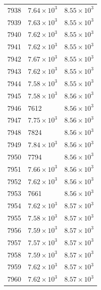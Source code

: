 \begin{table}[H]
\begin{tabular}{lll}
7938 & $\displaystyle 7.64 \times 10^{3}$ & $\displaystyle 8.55 \times 10^{3}$ \\
7939 & $\displaystyle 7.63 \times 10^{3}$ & $\displaystyle 8.55 \times 10^{3}$ \\
7940 & $\displaystyle 7.62 \times 10^{3}$ & $\displaystyle 8.55 \times 10^{3}$ \\
7941 & $\displaystyle 7.62 \times 10^{3}$ & $\displaystyle 8.55 \times 10^{3}$ \\
7942 & $\displaystyle 7.67 \times 10^{3}$ & $\displaystyle 8.55 \times 10^{3}$ \\
7943 & $\displaystyle 7.62 \times 10^{3}$ & $\displaystyle 8.55 \times 10^{3}$ \\
7944 & $\displaystyle 7.58 \times 10^{3}$ & $\displaystyle 8.55 \times 10^{3}$ \\
7945 & $\displaystyle 7.58 \times 10^{3}$ & $\displaystyle 8.56 \times 10^{3}$ \\
7946 & 7612 & $\displaystyle 8.56 \times 10^{3}$ \\
7947 & $\displaystyle 7.75 \times 10^{3}$ & $\displaystyle 8.56 \times 10^{3}$ \\
7948 & 7824 & $\displaystyle 8.56 \times 10^{3}$ \\
7949 & $\displaystyle 7.84 \times 10^{3}$ & $\displaystyle 8.56 \times 10^{3}$ \\
7950 & 7794 & $\displaystyle 8.56 \times 10^{3}$ \\
7951 & $\displaystyle 7.66 \times 10^{3}$ & $\displaystyle 8.56 \times 10^{3}$ \\
7952 & $\displaystyle 7.62 \times 10^{3}$ & $\displaystyle 8.56 \times 10^{3}$ \\
7953 & 7661 & $\displaystyle 8.56 \times 10^{3}$ \\
7954 & $\displaystyle 7.62 \times 10^{3}$ & $\displaystyle 8.57 \times 10^{3}$ \\
7955 & $\displaystyle 7.58 \times 10^{3}$ & $\displaystyle 8.57 \times 10^{3}$ \\
7956 & $\displaystyle 7.59 \times 10^{3}$ & $\displaystyle 8.57 \times 10^{3}$ \\
7957 & $\displaystyle 7.57 \times 10^{3}$ & $\displaystyle 8.57 \times 10^{3}$ \\
7958 & $\displaystyle 7.59 \times 10^{3}$ & $\displaystyle 8.57 \times 10^{3}$ \\
7959 & $\displaystyle 7.62 \times 10^{3}$ & $\displaystyle 8.57 \times 10^{3}$ \\
7960 & $\displaystyle 7.62 \times 10^{3}$ & $\displaystyle 8.57 \times 10^{3}$ \\

\end{tabular}
\end{table}
